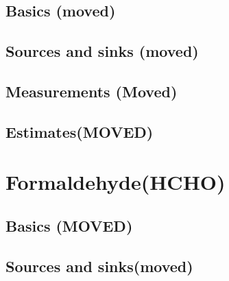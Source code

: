   \subsection{Basics (moved)}
  \subsection{Sources and sinks (moved)}
  \subsection{Measurements (Moved)}
  \subsection{Estimates(MOVED)}
\section{Formaldehyde(HCHO)}
\label{ch_LitRev:sec:HCHO}
  
  \subsection{Basics (MOVED)}
    
    
    
    
  \subsection{Sources and sinks(moved)}
    
    

